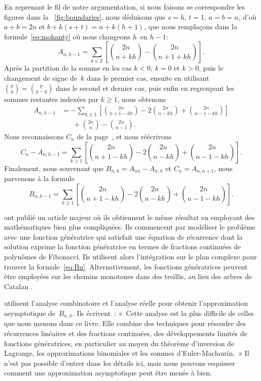 En reprenant le fil de notre argumentation, si nous faisons se
correspondre les figures dans la \fig~\ref{fig:boundaries}, nous
déduisons que \(s=h\), \(t=1\), \(a=b=n\), d'où \(a+b=2n\) et
\(b+k(s+t)=n+k(h+1)\), que nous remplaçons dans la
formule~\eqref{eq:mohanty} où nous changeons \(h\)~en \(h-1\):
\begin{equation*}
A_{n,h-1} = \sum_{k \in \mathbb{Z}}\left[\binom{2n}{n+kh} -
           \binom{2n}{n+1+kh}\right].
\end{equation*}
Après la partition de la somme en les cas \(k<0\), \(k=0\) et \(k>0\),
puis le changement de signe de~\(k\) dans le premier cas, ensuite en
utilisant \(\binom{p}{q} = \binom{p}{p-q}\) dans le second et dernier
cas, puis enfin en regroupant les sommes restantes indexées par \(k
\geqslant 1\), nous obtenons
\begin{align*}
A_{n,h-1}
  &= - \sum_{k \geqslant 1}\left[\binom{2n}{n+1-kh} -
    2\binom{2n}{n-kh} + \binom{2n}{n-1-kh}\right]\\
  &\phantom{=}\; + \binom{2n}{n} - \binom{2n}{n-1}.
\end{align*}
Nous reconnaissons \(C_n\) de la page~\pageref{eq:Ann}, et nous
réécrivons
\begin{equation*}
C_n - A_{n,h-1}
  = \sum_{k \geqslant 1}\left[\binom{2n}{n+1-kh} -
    2\binom{2n}{n-kh} + \binom{2n}{n-1-kh}\right].
\end{equation*}
Finalement, nous souvenant que \(B_{n,h} = A_{nn} - A_{n,h}\) et \(C_n =
A_{n,n+1}\), nous parvenons à la formule
\begin{equation}
B_{n,h-1} = \sum_{k \geqslant 1}
            \left[\binom{2n}{n+1-kh} - 2\binom{2n}{n-kh}
            + \binom{2n}{n-1-kh}\right].
\label{eq:Bn}
\end{equation}

\citet*{KnuthdeBruijnRice_1972} ont publié un article majeur où ils
obtiennent le même résultat en employant des mathématiques bien plus
compliquées. Ils commencent par modéliser le problème avec une
fonction génératrice \citep{Wilf_1990} qui satisfait une équation de
récurrence dont la solution exprime la fonction génératrice en termes
de fractions continuées de polynômes de Fibonacci. Ils utilisent alors
l'intégration sur le plan complexe pour trouver la
formule~\eqref{eq:Bn}. Alternativement, les fonctions génératrices
peuvent être employées sur les chemins monotones dans des treillis, au
lieu des arbres de Catalan \citep[page~64]{Kemp_1984}
\citep{FlajoletNebelProdinger_2006}.

\citet*{SedgewickFlajolet_1996} \citep{FlajoletSedgewick_2009} utilisent l'analyse combinatoire et l'analyse réelle pour obtenir l'approximation asymptotique de~\(B_{n,h}\). Ils écrivent~\cite[p.~260]{SedgewickFlajolet_1996}: «~Cette analyse est la plus difficile de celles que nous menons dans ce livre. Elle combine des techniques pour résoudre des récurrences linéaires et des fractions continuées, des développements limités de fonctions génératrices, en particulier au moyen du théorème d'inversion de Lagrange, les approximations binomiales et les sommes d'Euler\--Maclaurin.~» Il n'est pas possible d'entrer dans les détails ici, mais nous pouvons esquisser comment une approximation asymptotique peut être menée à bien.

